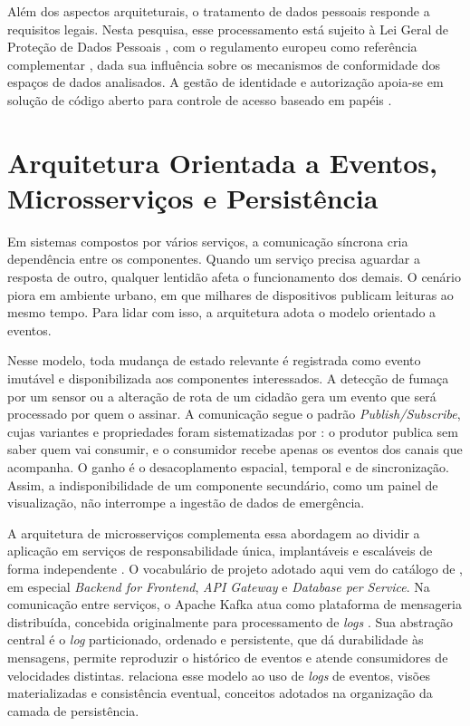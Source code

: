 Além dos aspectos arquiteturais, o tratamento de dados pessoais responde a requisitos legais. Nesta pesquisa, esse processamento está sujeito à Lei Geral de Proteção de Dados Pessoais \cite{brasil2018lgpd}, com o regulamento europeu como referência complementar \cite{eu2016gdpr}, dada sua influência sobre os mecanismos de conformidade dos espaços de dados analisados. A gestão de identidade e autorização apoia-se em solução de código aberto para controle de acesso baseado em papéis \cite{keycloak2025}.

\section{Arquitetura Orientada a Eventos, Microsserviços e Persistência}
\label{sec:eda}

Em sistemas compostos por vários serviços, a comunicação síncrona cria dependência entre os componentes. Quando um serviço precisa aguardar a resposta de outro, qualquer lentidão afeta o funcionamento dos demais. O cenário piora em ambiente urbano, em que milhares de dispositivos publicam leituras ao mesmo tempo. Para lidar com isso, a arquitetura adota o modelo orientado a eventos.

Nesse modelo, toda mudança de estado relevante é registrada como evento imutável e disponibilizada aos componentes interessados. A detecção de fumaça por um sensor ou a alteração de rota de um cidadão gera um evento que será processado por quem o assinar. A comunicação segue o padrão \textit{Publish/Subscribe}, cujas variantes e propriedades foram sistematizadas por : o produtor publica sem saber quem vai consumir, e o consumidor recebe apenas os eventos dos canais que acompanha. O ganho é o desacoplamento espacial, temporal e de sincronização. Assim, a indisponibilidade de um componente secundário, como um painel de visualização, não interrompe a ingestão de dados de emergência.

A arquitetura de microsserviços complementa essa abordagem ao dividir a aplicação em serviços de responsabilidade única, implantáveis e escaláveis de forma independente \cite{newman2021building}. O vocabulário de projeto adotado aqui vem do catálogo de , em especial \textit{Backend for Frontend}, \textit{API Gateway} e \textit{Database per Service}. Na comunicação entre serviços, o Apache Kafka atua como plataforma de mensageria distribuída, concebida originalmente para processamento de \textit{logs} \cite{kreps2011kafka}. Sua abstração central é o \textit{log} particionado, ordenado e persistente, que dá durabilidade às mensagens, permite reproduzir o histórico de eventos e atende consumidores de velocidades distintas.  relaciona esse modelo ao uso de \textit{logs} de eventos, visões materializadas e consistência eventual, conceitos adotados na organização da camada de persistência.

